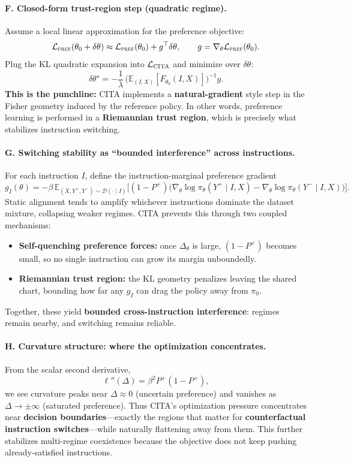 \paragraph{\textbf{F. Closed-form trust-region step (quadratic regime).}}
Assume a local linear approximation for the preference objective:
\[
\mathcal{L}_{\textsc{pref}}(\theta_0+\delta\theta)
\approx
\mathcal{L}_{\textsc{pref}}(\theta_0)+g^\top\delta\theta,
\qquad
g=\nabla_\theta\mathcal{L}_{\textsc{pref}}(\theta_0).
\]
Plug the KL quadratic expansion into $\mathcal{L}_{\textsc{CITA}}$ and minimize over $\delta\theta$:
\[
\delta\theta^\star
=
-\frac{1}{\lambda}\,
\Big(\mathbb{E}_{(I,X)}[F_{\theta_0}(I,X)]\Big)^{-1}g.
\]
\textbf{This is the punchline:} CITA implements a \textbf{natural-gradient} style step in the Fisher geometry induced by the reference policy. In other words, preference learning is performed in a \textbf{Riemannian trust region}, which is precisely what stabilizes instruction switching.

\vspace{-0.35em}
\paragraph{\textbf{G. Switching stability as ``bounded interference'' across instructions.}}
For each instruction $I$, define the instruction-marginal preference gradient
\[
g_I(\theta)
=
-\beta\,
\mathbb{E}_{(X,Y^+,Y^-)\sim\mathcal{D}(\cdot\mid I)}
\Big[
(1-P^+)\big(
\nabla_\theta\log\pi_\theta(Y^+\mid I,X)-\nabla_\theta\log\pi_\theta(Y^-\mid I,X)
\big)
\Big].
\]
Static alignment tends to amplify whichever instructions dominate the dataset mixture, collapsing weaker regimes.
CITA prevents this through two coupled mechanisms:
\begin{itemize}
\item \textbf{Self-quenching preference forces:} once $\Delta_\theta$ is large, $(1-P^+)$ becomes small, so no single instruction can grow its margin unboundedly.
\item \textbf{Riemannian trust region:} the KL geometry penalizes leaving the shared chart, bounding how far any $g_I$ can drag the policy away from $\pi_0$.
\end{itemize}
Together, these yield \textbf{bounded cross-instruction interference}: regimes remain nearby, and switching remains reliable.

\vspace{-0.35em}
\paragraph{\textbf{H. Curvature structure: where the optimization concentrates.}}
From the scalar second derivative,
\[
\ell''(\Delta)=\beta^2P^+(1-P^+),
\]
we see curvature peaks near $\Delta\approx 0$ (uncertain preference) and vanishes as $\Delta\to\pm\infty$ (saturated preference).
Thus CITA’s optimization pressure concentrates near \textbf{decision boundaries}---exactly the regions that matter for \textbf{counterfactual instruction switches}---while naturally flattening away from them.
This further stabilizes multi-regime coexistence because the objective does not keep pushing already-satisfied instructions.


